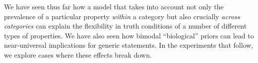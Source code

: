 \documentclass[10pt,letterpaper]{article}
\begin{document}
We have seen thus far how a model that takes into account not only the prevalence of a particular property \emph{within} a category but also crucially \emph{across categories} can explain the flexibility in truth conditions of a number of different types of properties. We have also seen how bimodal ``biological'' priors can lead to near-universal implications for generic statements. In the experiments that follow, we explore cases where these effects break down.




%
%
%
%
%
%
\end{document}
